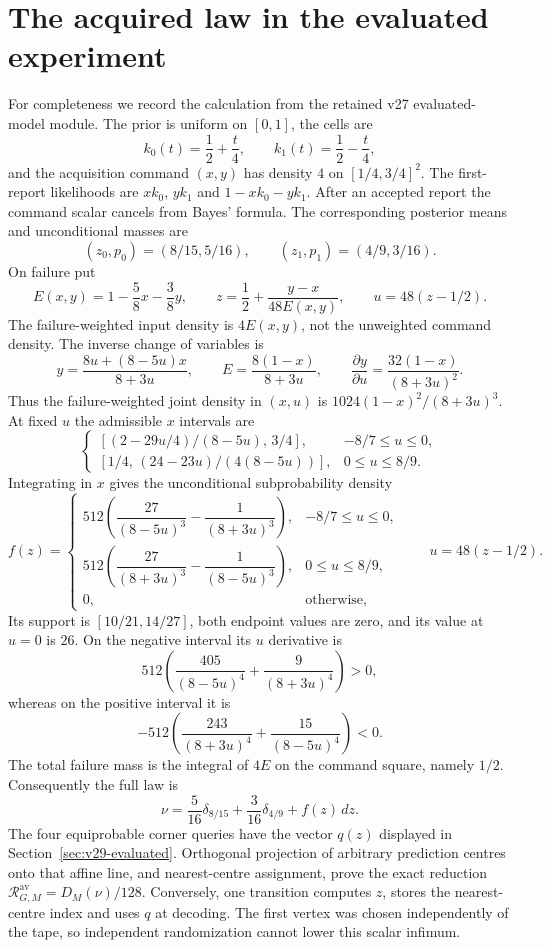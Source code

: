 \documentclass[11pt]{amsart}
\theoremstyle{definition}\newtheorem{definition}[theorem]{Definition}
\theoremstyle{remark}\newtheorem{remark}[theorem]{Remark}
\begin{document}
\section{The acquired law in the evaluated experiment}
\label{app:v29-density}
For completeness we record the calculation from the retained v27 evaluated-model module. The prior is uniform on $[0,1]$, the cells are
\[
 k_0(t)=\frac12+\frac t4,\qquad k_1(t)=\frac12-\frac t4,
\]
and the acquisition command $(x,y)$ has density $4$ on $[1/4,3/4]^2$. The first-report likelihoods are $xk_0$, $yk_1$ and $1-xk_0-yk_1$. After an accepted report the command scalar cancels from Bayes' formula. The corresponding posterior means and unconditional masses are
\[
 (z_0,p_0)=(8/15,5/16),\qquad (z_1,p_1)=(4/9,3/16).
\]
On failure put
\[
 E(x,y)=1-\frac58x-\frac38y,
 \qquad z=\frac12+\frac{y-x}{48E(x,y)},
 \qquad u=48(z-1/2).
\]
The failure-weighted input density is $4E(x,y)$, not the unweighted command density. The inverse change of variables is
\[
 y=\frac{8u+(8-5u)x}{8+3u},\qquad
 E=\frac{8(1-x)}{8+3u},\qquad
 \frac{\partial y}{\partial u}=\frac{32(1-x)}{(8+3u)^2}.
\]
Thus the failure-weighted joint density in $(x,u)$ is $1024(1-x)^2/(8+3u)^3$. At fixed $u$ the admissible $x$ intervals are
\[
 \begin{cases}
 [(2-29u/4)/(8-5u),\,3/4],&-8/7\le u\le0,\\
 [1/4,\,(24-23u)/(4(8-5u))],&0\le u\le8/9.
 \end{cases}
\]
Integrating in $x$ gives the unconditional subprobability density
\begin{equation}\label{eq:v29-density}
 f(z)=
 \begin{cases}
 512\left(\dfrac{27}{(8-5u)^3}-\dfrac1{(8+3u)^3}\right),&-8/7\le u\le0,\\[6pt]
 512\left(\dfrac{27}{(8+3u)^3}-\dfrac1{(8-5u)^3}\right),&0\le u\le8/9,\\[6pt]
 0,&\text{otherwise},
 \end{cases}
 \qquad u=48(z-1/2).
\end{equation}
Its support is $[10/21,14/27]$, both endpoint values are zero, and its value at $u=0$ is $26$. On the negative interval its $u$ derivative is
\[
 512\left(\frac{405}{(8-5u)^4}+\frac9{(8+3u)^4}\right)>0,
\]
whereas on the positive interval it is
\[
 -512\left(\frac{243}{(8+3u)^4}+\frac{15}{(8-5u)^4}\right)<0.
\]
The total failure mass is the integral of $4E$ on the command square, namely $1/2$. Consequently the full law is
\[
 \nu=\frac5{16}\delta_{8/15}+\frac3{16}\delta_{4/9}+f(z)\,dz.
\]
The four equiprobable corner queries have the vector $q(z)$ displayed in Section~\ref{sec:v29-evaluated}. Orthogonal projection of arbitrary prediction centres onto that affine line, and nearest-centre assignment, prove the exact reduction $\mathcal R^{\mathrm{av}}_{G,M}=D_M(\nu)/128$. Conversely, one transition computes $z$, stores the nearest-centre index and uses $q$ at decoding. The first vertex was chosen independently of the tape, so independent randomization cannot lower this scalar infimum.
\end{document}
